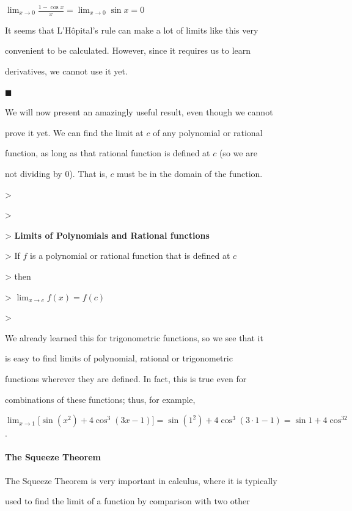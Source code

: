 $\lim_{x \rightarrow 0}\frac{1-\cos x}{x}=\lim_{x \rightarrow 0}\sin x=0$



It seems that L'Hôpital's rule can make a lot of limits like this very

convenient to be calculated. However, since it requires us to learn

derivatives, we cannot use it yet.



$\blacksquare$



We will now present an amazingly useful result, even though we cannot

prove it yet. We can find the limit at $c$ of any polynomial or rational

function, as long as that rational function is defined at $c$ (so we are

not dividing by 0). That is, $c$ must be in the domain of the function.



> 

>

>    \textbf{Limits of Polynomials and Rational functions}

>    If $f$ is a polynomial or rational function that is defined at $c$

>     then

>    $\lim_{x\to c}f(x)=f(c)$

>     



We already learned this for trigonometric functions, so we see that it

is easy to find limits of polynomial, rational or trigonometric

functions wherever they are defined. In fact, this is true even for

combinations of these functions; thus, for example,

$\lim_{x\to1}\bigg[\sin(x^2)+4\cos^3(3x-1)\bigg]=\sin(1^2)+4\cos^3(3\cdot 1-1)=\sin 1+4\cos^32$.



\paragraph{The Squeeze Theorem}



The Squeeze Theorem is very important in calculus, where it is typically

used to find the limit of a function by comparison with two other

